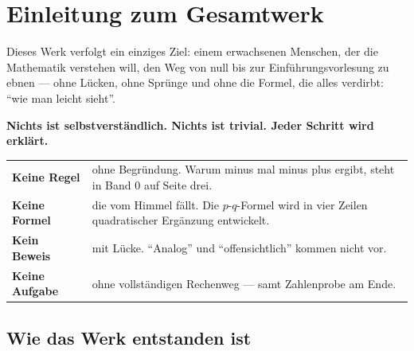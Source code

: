 \chapter*{Einleitung zum Gesamtwerk}

\begin{merksatz}
Dieses Werk verfolgt ein einziges Ziel: einem erwachsenen Menschen, der die Mathematik verstehen will, den Weg von null bis zur Einführungsvorlesung zu ebnen --- ohne Lücken, ohne Sprünge und ohne die Formel, die alles verdirbt: \enquote{wie man leicht sieht}.

\begin{center}
\begin{minipage}{0.9\textwidth}
\textbf{Nichts ist selbstverständlich. Nichts ist trivial. Jeder Schritt wird erklärt.}
\end{minipage}
\end{center}

\begin{center}
{\small
\renewcommand{\arraystretch}{1.52}
\begin{tabular}{@{}P{2.8cm}P{5.8cm}@{}}
\toprule
\textbf{Keine Regel} & ohne Begründung. Warum minus mal minus plus ergibt, steht in Band 0 auf Seite drei.\\
\textbf{Keine Formel} & die vom Himmel fällt. Die $p$-$q$-Formel wird in vier Zeilen quadratischer Ergänzung entwickelt.\\
\textbf{Kein Beweis} & mit Lücke. \enquote{Analog} und \enquote{offensichtlich} kommen nicht vor.\\
\textbf{Keine Aufgabe} & ohne vollständigen Rechenweg --- samt Zahlenprobe am Ende.\\
\bottomrule
\end{tabular}}
\end{center}

\begin{center}
\begin{minipage}{0.88\textwidth}
\end{minipage}
\end{center}
\end{merksatz}

\section*{Wie das Werk entstanden ist}

